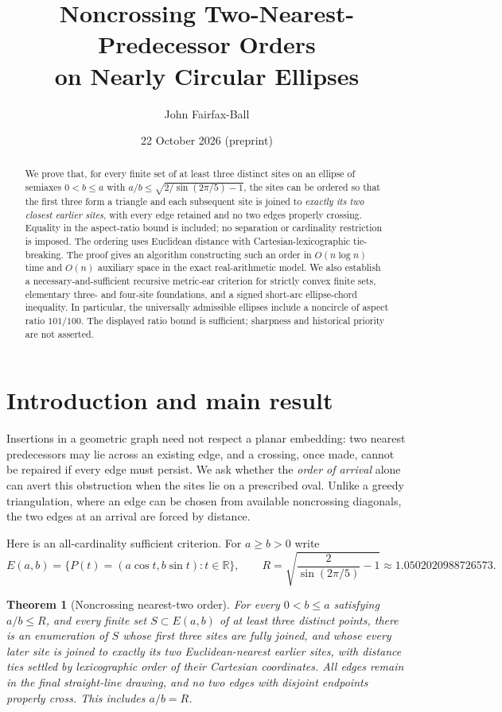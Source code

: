 \documentclass[11pt,a4paper]{article}
\title{\bfseries Noncrossing Two-Nearest-Predecessor Orders\\[2mm]on Nearly Circular Ellipses}
\author{John Fairfax-Ball}
\date{22 October 2026 \quad (preprint)}
\newtheorem{theorem}{Theorem}[section]
\theoremstyle{definition}\newtheorem{definition}[theorem]{Definition}
\theoremstyle{remark}\newtheorem{remark}[theorem]{Remark}
\newcommand{\Rbound}{R}
\newcommand{\Ell}{E(a,b)}
\begin{document}
\maketitle
\begin{abstract}
We prove that, for every finite set of at least three distinct sites on an ellipse of semiaxes $0<b\le a$ with $a/b\le\sqrt{2/\sin(2\pi/5)-1}$, the sites can be ordered so that the first three form a triangle and each subsequent site is joined to \emph{exactly its two closest earlier sites}, with every edge retained and no two edges properly crossing. Equality in the aspect-ratio bound is included; no separation or cardinality restriction is imposed. The ordering uses Euclidean distance with Cartesian-lexicographic tie-breaking. The proof gives an algorithm constructing such an order in $O(n\log n)$ time and $O(n)$ auxiliary space in the exact real-arithmetic model. We also establish a necessary-and-sufficient recursive metric-ear criterion for strictly convex finite sets, elementary three- and four-site foundations, and a signed short-arc ellipse-chord inequality. In particular, the universally admissible ellipses include a noncircle of aspect ratio $101/100$. The displayed ratio bound is sufficient; sharpness and historical priority are not asserted.
\end{abstract}

\section{Introduction and main result}
Insertions in a geometric graph need not respect a planar embedding: two nearest predecessors may lie across an existing edge, and a crossing, once made, cannot be repaired if every edge must persist. We ask whether the \emph{order of arrival} alone can avert this obstruction when the sites lie on a prescribed oval. Unlike a greedy triangulation, where an edge can be chosen from available noncrossing diagonals, the two edges at an arrival are forced by distance.

Here is an all-cardinality sufficient criterion. For $a\ge b>0$ write
\begin{equation}\label{eq:R}
 \Ell=\{P(t)=(a\cos t,b\sin t):t\in\mathbb R\},\qquad
 \Rbound=\sqrt{\frac{2}{\sin(2\pi/5)}-1}\approx1.0502020988726573.
\end{equation}

\begin{theorem}[Noncrossing nearest-two order]\label{thm:ellipse}
For every $0<b\le a$ satisfying $a/b\le\Rbound$, and every finite set $S\subset\Ell$ of at least three distinct points, there is an enumeration of $S$ whose first three sites are fully joined, and whose every later site is joined to \emph{exactly} its two Euclidean-nearest \emph{earlier} sites, with distance ties settled by lexicographic order of their Cartesian coordinates. All edges remain in the final straight-line drawing, and no two edges with disjoint endpoints properly cross. This includes $a/b=\Rbound$.
\end{theorem}
\end{document}
